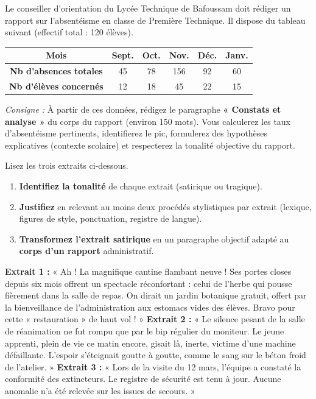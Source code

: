 \documentclass[11pt]{article}
\newcommand{\cle}[1]{{\popxbold\color{popdark}#1}}
\begin{document}
\begin{exercice}
Le conseiller d'orientation du Lycée Technique de Bafoussam doit rédiger un rapport sur l'absentéisme en classe de Première Technique. Il dispose du tableau suivant (effectif total : 120 élèves).
\begin{center}
\begin{tabular}{|c|c|c|c|c|c|}\hline
\textbf{Mois} & \textbf{Sept.} & \textbf{Oct.} & \textbf{Nov.} & \textbf{Déc.} & \textbf{Janv.} \\\hline
\textbf{Nb d'absences totales} & 45 & 78 & 156 & 92 & 60 \\\hline
\textbf{Nb d'élèves concernés} & 12 & 18 & 45 & 22 & 15 \\\hline
\end{tabular}
\end{center}
\emph{Consigne :} À partir de ces données, rédigez le paragraphe \textbf{« Constats et analyse »} du corps du rapport (environ 150 mots). Vous calculerez les taux d'absentéisme pertinents, identifierez le pic, formulerez des hypothèses explicatives (contexte scolaire) et respecterez la tonalité objective du rapport.
\end{exercice}

\begin{exercice}
Lisez les trois extraits ci-dessous.
\begin{enumerate}
    \item \textbf{Identifiez la tonalité} de chaque extrait (\cle{satirique} ou \cle{tragique}).
    \item \textbf{Justifiez} en relevant au moins deux procédés stylistiques par extrait (lexique, figures de style, ponctuation, registre de langue).
    \item \textbf{Transformez l'extrait satirique} en un paragraphe objectif adapté au \textbf{corps d'un rapport} administratif.
\end{enumerate}
\textbf{Extrait 1 :} « Ah ! La magnifique cantine flambant neuve ! Ses portes closes depuis six mois offrent un spectacle réconfortant : celui de l'herbe qui pousse fièrement dans la salle de repas. On dirait un jardin botanique gratuit, offert par la bienveillance de l'administration aux estomacs vides des élèves. Bravo pour cette « restauration » de haut vol ! »
\textbf{Extrait 2 :} « Le silence pesant de la salle de réanimation ne fut rompu que par le bip régulier du moniteur. Le jeune apprenti, plein de vie ce matin encore, gisait là, inerte, victime d'une machine défaillante. L'espoir s'éteignait goutte à goutte, comme le sang sur le béton froid de l'atelier. »
\textbf{Extrait 3 :} « Lors de la visite du 12 mars, l'équipe a constaté la conformité des extincteurs. Le registre de sécurité est tenu à jour. Aucune anomalie n'a été relevée sur les issues de secours. »
\end{exercice}
\end{document}
